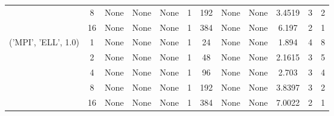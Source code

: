 \begin{tabular}{cccccccccccc}
& 8& None& None& None& 1& 192& None& None& 3.4519& 3& 2\\
& 16& None& None& None& 1& 384& None& None& 6.197& 2& 1\\
\hline
\multirow{5}{*}{('MPI', 'ELL', 1.0)}& 1& None& None& None& 1& 24& None& None& 1.894& 4& 8\\
& 2& None& None& None& 1& 48& None& None& 2.1615& 3& 5\\
& 4& None& None& None& 1& 96& None& None& 2.703& 3& 4\\
& 8& None& None& None& 1& 192& None& None& 3.8397& 3& 2\\
& 16& None& None& None& 1& 384& None& None& 7.0022& 2& 1\\
\hline
\end{tabular}
